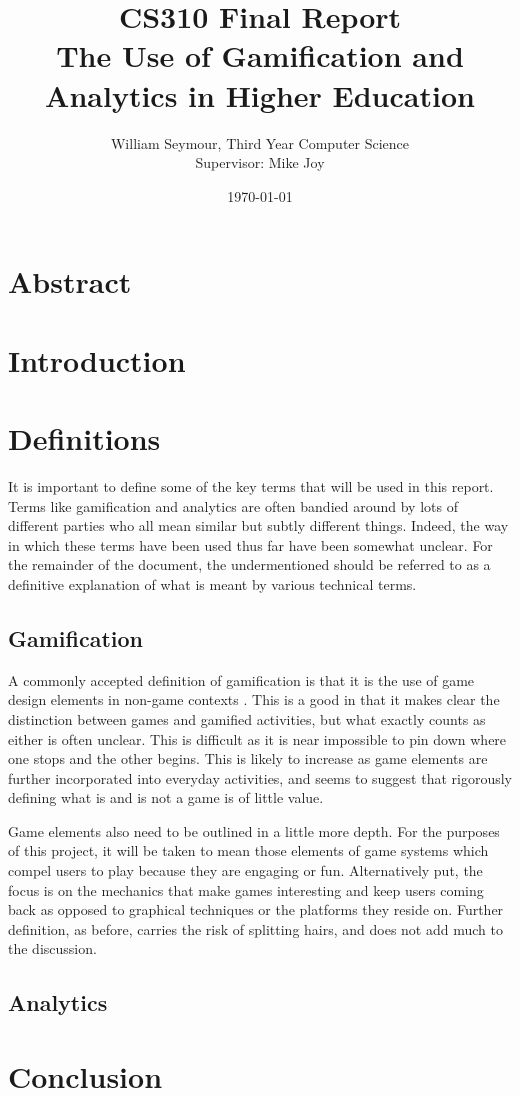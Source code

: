 \documentclass{report}
\title{CS310 Final Report \\ The Use of Gamification and Analytics in Higher Education}
\author{William Seymour, Third Year Computer Science \\ Supervisor: Mike Joy}
\date{\today}
\begin{document}
\maketitle
\clearpage
\tableofcontents
\section{Abstract}

\section{Introduction}

\section{Definitions}
It is important to define some of the key terms that will be used in this report. Terms like gamification and analytics are often bandied around by lots of different parties who all mean similar but subtly different things. Indeed, the way in which these terms have been used thus far have been somewhat unclear. For the remainder of the document, the undermentioned should be referred to as a definitive explanation of what is meant by various technical terms.

\subsection{Gamification}
A commonly accepted definition of gamification is that it is the use of game design elements in non-game contexts \cite{deterding2011game}. This is a good in that it makes clear the distinction between games and gamified activities, but what exactly counts as either is often unclear. This is difficult as it is near impossible to pin down where one stops and the other begins. This is likely to increase as game elements are further incorporated into everyday activities, and seems to suggest that rigorously defining what is and is not a game is of little value. 

Game elements also need to be outlined in a little more depth. For the purposes of this project, it will be taken to mean those elements of game systems which compel users to play because they are engaging or fun. Alternatively put, the focus is on the mechanics that make games interesting and keep users coming back as opposed to graphical techniques or the platforms they reside on. Further definition, as before, carries the risk of splitting hairs, and does not add much to the discussion.

\subsection{Analytics}

\section{Conclusion}



\end{document}
